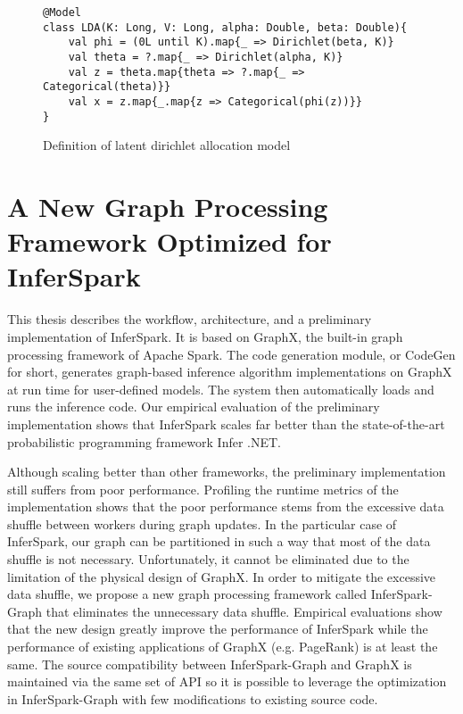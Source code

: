 \begin{figure}
\begin{lstlisting}
@Model
class LDA(K: Long, V: Long, alpha: Double, beta: Double){
	val phi = (0L until K).map{_ => Dirichlet(beta, K)}
	val theta = ?.map{_ => Dirichlet(alpha, K)}
	val z = theta.map{theta => ?.map{_ => Categorical(theta)}}
	val x = z.map{_.map{z => Categorical(phi(z))}}
}
\end{lstlisting}
\caption{Definition of latent dirichlet allocation model}
\label{fig:intro_lda_def}
\end{figure}

\section{A New Graph Processing Framework Optimized for InferSpark}

This thesis describes the workflow, architecture, and a preliminary
implementation of InferSpark. It is based on GraphX, the built-in graph
processing framework of Apache Spark. The code generation module, or CodeGen
for short, generates graph-based inference algorithm implementations on GraphX
at run time for user-defined models. The system then automatically loads and
runs the inference code. Our empirical evaluation of the preliminary
implementation shows that InferSpark scales far better than the state-of-the-art
probabilistic programming framework Infer .NET.

Although scaling better than other frameworks, the preliminary implementation
still suffers from poor performance. Profiling the runtime
metrics of the implementation shows that the poor performance stems from the
excessive data shuffle between workers during graph updates. In the particular
case of InferSpark, our graph can be partitioned in such a way that most of the
data shuffle is not necessary. Unfortunately, it cannot be eliminated due to
the limitation of the physical design of GraphX. In order to mitigate the
excessive data shuffle, we propose a new graph processing framework called
InferSpark-Graph that eliminates the unnecessary data shuffle. Empirical
evaluations show that the new design greatly improve the performance of
InferSpark while the performance of existing applications of GraphX (e.g.
PageRank) is at least the same. The source compatibility between
InferSpark-Graph and GraphX is maintained via the same set of API so it is
possible to leverage the optimization in InferSpark-Graph with few
modifications to existing source code.

